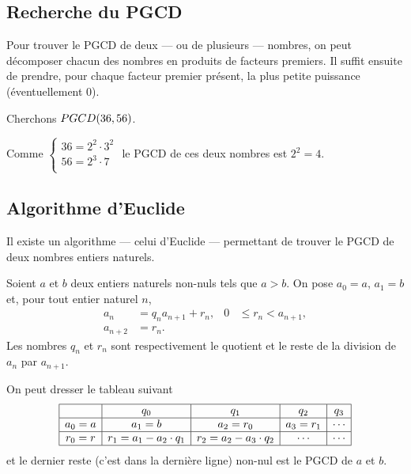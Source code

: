       \subsection*{Recherche du PGCD}
            Pour trouver le PGCD de deux --- ou de plusieurs --- nombres, 
            on peut d\'ecomposer chacun des nombres en produits de facteurs premiers.
            Il suffit ensuite de prendre, pour chaque facteur premier pr\'esent, la plus petite puissance
            (\'eventuellement $0$).
            
            \begin{ex}
                  Cherchons $PGCD(36,56)$.
                  
                  Comme 
                  $
                  \left\lbrace
                  \begin{array}{l}
                        36 = 2^2 \cdot 3^2 \\
                        56 = 2^3 \cdot 7 \\
                  \end{array}
                  \right.
                  $
                  le PGCD de ces deux nombres est $2^2 = 4$.
            \end{ex}
      \subsection*{Algorithme d'Euclide}
            Il existe un algorithme --- celui d'Euclide --- permettant de trouver le PGCD de deux nombres entiers naturels.
            
            Soient $a$ et $b$ deux entiers naturels non-nuls tels que $a>b$.
            On pose $a_0=a$, $a_1=b$ et, pour tout entier naturel $n$,
            \[
              \begin{aligned}
                a_n &= q_n a_{n+1}+r_n,
                & 0 &\leq r_n<a_{n+1}, \\
                a_{n+2} &= r_n.
              \end{aligned}
            \]
            Les nombres $q_n$ et $r_n$ sont respectivement le quotient et le
            reste de la division de $a_n$ par $a_{n+1}$.
                  
            On peut dresser le tableau suivant
            \[
            \begin{array}{|c|c|c|c|c|}
            \hline 
              & q_0 & q_1 & q_2 & q_3 \\ 
            \hline 
            a_0 = a & a_1 = b & a_2 = r_0 & a_3 = r_1  & \cdots \\ 
            \hline 
            r_0 = r & r_1 = a_1 - a_2 \cdot q_1 & r_2 = a_2 - a_3 \cdot q_2 & \cdots & \cdots \\ 
            \hline 
            \end{array} 
            \]
            et le dernier reste (c'est dans la derni\`ere ligne) non-nul est le PGCD de $a$ et $b$.
            
